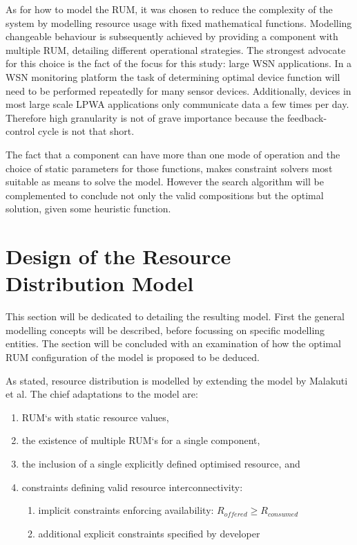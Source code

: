 As for how to model the RUM, it was chosen to reduce the complexity of the system by modelling resource usage with fixed mathematical functions. Modelling changeable behaviour is subsequently achieved by providing a component with multiple RUM, detailing different operational strategies. The strongest advocate for this choice is the fact of the focus for this study: large WSN applications. In a WSN monitoring platform the task of determining optimal device function will need to be performed repeatedly for many sensor devices. Additionally, devices in most large scale LPWA applications only communicate data a few times per day\cite{refs over size zoeken}. Therefore high granularity is not of grave importance because the feedback-control cycle is not that short. 

The fact that a component can have more than one mode of operation and the choice of static parameters for those functions, makes constraint solvers most suitable as means to solve the model. However the search algorithm will be complemented to conclude not only the valid compositions but the optimal solution, given some heuristic function.

\section{Design of the Resource Distribution Model}
This section will be dedicated to detailing the resulting model. First the general modelling concepts will be described, before focussing on specific modelling entities. The section will be concluded with an examination of how the optimal RUM configuration of the model is proposed to be deduced.

As stated, resource distribution is modelled by extending the model by Malakuti et al\cite{steven_te_brinke}. The chief adaptations to the model are:
\begin{enumerate}
\nospace
\item RUM`s with static resource values,
\item the existence of multiple RUM`s for a single component,
\item the inclusion of a single explicitly defined optimised resource, and
\item constraints defining valid resource interconnectivity:
\begin{enumerate}
\nospace
\item implicit constraints enforcing availability: $R_{offered} \geq R_{consumed}$
\item additional explicit constraints specified by developer
\end{enumerate}
\end{enumerate}

